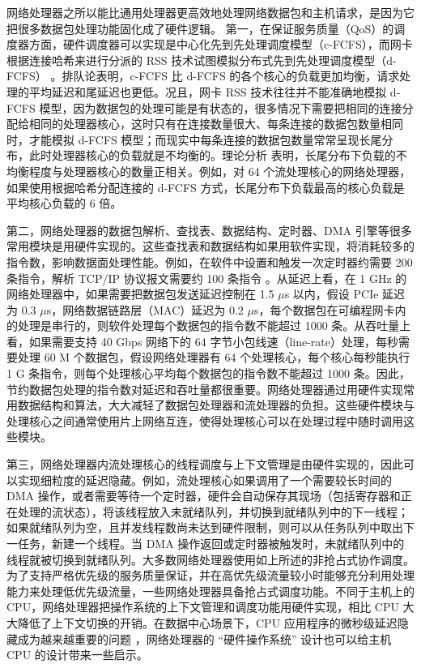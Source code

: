 网络处理器之所以能比通用处理器更高效地处理网络数据包和主机请求，是因为它把很多数据包处理功能固化成了硬件逻辑。
第一，在保证服务质量（QoS）的调度器方面，硬件调度器可以实现是中心化先到先处理调度模型（c-FCFS），而网卡根据连接哈希来进行分派的 RSS 技术试图模拟分布式先到先处理调度模型（d-FCFS） \cite{kaffes2019shinjuku,ousterhout2019shenango}。排队论表明，c-FCFS 比 d-FCFS 的各个核心的负载更加均衡，请求处理的平均延迟和尾延迟也更低。况且，网卡 RSS 技术往往并不能准确地模拟 d-FCFS 模型，因为数据包的处理可能是有状态的，很多情况下需要把相同的连接分配给相同的处理器核心，这时只有在连接数量很大、每条连接的数据包数量相同时，才能模拟 d-FCFS 模型；而现实中每条连接的数据包数量常常呈现长尾分布，此时处理器核心的负载就是不均衡的。理论分析 \cite{li2017kv} 表明，长尾分布下负载的不均衡程度与处理器核心的数量正相关。例如，对 64 个流处理核心的网络处理器，如果使用根据哈希分配连接的 d-FCFS 方式，长尾分布下负载最高的核心负载是平均核心负载的 6 倍。

第二，网络处理器的数据包解析、查找表、数据结构、定时器、DMA 引擎等很多常用模块是用硬件实现的。这些查找表和数据结构如果用软件实现，将消耗较多的指令数，影响数据面处理性能。例如，在软件中设置和触发一次定时器约需要 200 条指令，解析 TCP/IP 协议报文需要约 100 条指令 \cite{clark1989analysis}。从延迟上看，在 1 GHz 的网络处理器中，如果需要把数据包发送延迟控制在 1.5 $\mu$s 以内，假设 PCIe 延迟为 0.3 $\mu$s，网络数据链路层（MAC）延迟为 0.2 $\mu$s，每个数据包在可编程网卡内的处理是串行的，则软件处理每个数据包的指令数不能超过 1000 条。从吞吐量上看，如果需要支持 40 Gbps 网络下的 64 字节小包线速（line-rate）处理，每秒需要处理 60 M 个数据包，假设网络处理器有 64 个处理核心，每个核心每秒能执行 1 G 条指令，则每个处理核心平均每个数据包的指令数不能超过 1000 条。因此，节约数据包处理的指令数对延迟和吞吐量都很重要。网络处理器通过用硬件实现常用数据结构和算法，大大减轻了数据包处理器和流处理器的负担。这些硬件模块与处理核心之间通常使用片上网络互连，使得处理核心可以在处理过程中随时调用这些模块。

第三，网络处理器内流处理核心的线程调度与上下文管理是由硬件实现的，因此可以实现细粒度的延迟隐藏。例如，流处理核心如果调用了一个需要较长时间的 DMA 操作，或者需要等待一个定时器，硬件会自动保存其现场（包括寄存器和正在处理的流状态），将该线程放入未就绪队列，并切换到就绪队列中的下一线程；如果就绪队列为空，且并发线程数尚未达到硬件限制，则可以从任务队列中取出下一任务，新建一个线程。当 DMA 操作返回或定时器被触发时，未就绪队列中的线程就被切换到就绪队列。大多数网络处理器使用如上所述的非抢占式协作调度。为了支持严格优先级的服务质量保证，并在高优先级流量较小时能够充分利用处理能力来处理低优先级流量，一些网络处理器具备抢占式调度功能。不同于主机上的 CPU，网络处理器把操作系统的上下文管理和调度功能用硬件实现，相比 CPU 大大降低了上下文切换的开销。在数据中心场景下，CPU 应用程序的微秒级延迟隐藏成为越来越重要的问题 \cite{barroso2017attack}，网络处理器的 ``硬件操作系统'' 设计也可以给主机 CPU 的设计带来一些启示。

